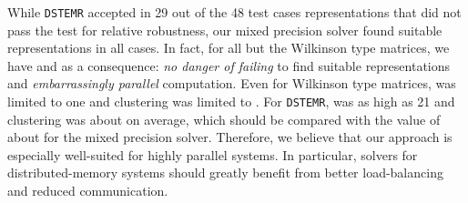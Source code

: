 \documentclass[final]{siamltex}
\begin{document}
 While {\tt DSTEMR} accepted in 29 out of the 48 test cases representations
 that did not pass the test for relative robustness, our mixed precision
 solver found suitable representations in all cases. In fact, 
for all but the Wilkinson type matrices, we have  and as a
consequence: {\it no danger of failing} to find suitable representations and
{\it embarrassingly parallel} computation. 
Even for Wilkinson type matrices,  was limited to one
and clustering  was limited to . 
For {\tt DSTEMR},  was as high as 21 and clustering  was
about  on average, which should 
be compared with the value of about  for the mixed precision solver.
Therefore, we
believe that our approach is especially well-suited for highly parallel
systems. In particular, solvers for distributed-memory systems should greatly
benefit from better load-balancing and reduced communication. 
\end{document}
